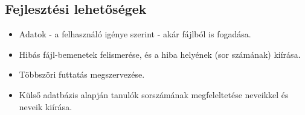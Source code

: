 \documentclass[a4paper]{article}
\begin{document}
    \subsection{Fejlesztési lehetőségek}
      \begin{itemize}
        \item Adatok - a felhasználó igénye szerint - akár fájlból is fogadása.
        \item Hibás fájl-bemenetek felismerése, és a hiba helyének (sor számának) kiírása.
        \item Többszöri futtatás megszervezése.
        \item Külső adatbázis alapján tanulók sorszámának megfeleltetése neveikkel és neveik kiírása.
      \end{itemize}
\end{document}

